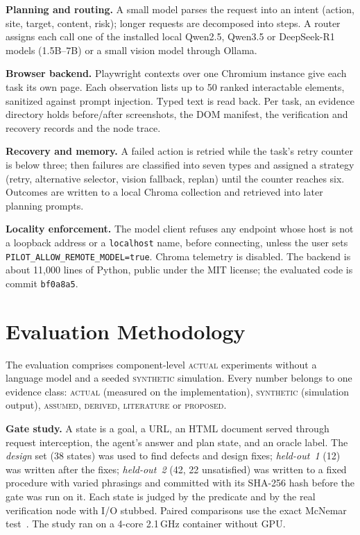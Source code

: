 \documentclass[conference]{IEEEtran}
\newcommand{\status}[1]{\textsc{#1}}
\begin{document}


\textbf{Planning and routing.} A small model parses the request into an intent (action, site, target, content, risk); longer requests are decomposed into steps. A router assigns each call one of the installed local Qwen2.5, Qwen3.5 or DeepSeek-R1 models (1.5B--7B) or a small vision model through Ollama.

\textbf{Browser backend.} Playwright contexts over one Chromium instance give each task its own page. Each observation lists up to 50 ranked interactable elements, sanitized against prompt injection. Typed text is read back. Per task, an evidence directory holds before/after screenshots, the DOM manifest, the verification and recovery records and the node trace.

\textbf{Recovery and memory.} A failed action is retried while the task's retry counter is below three; then failures are classified into seven types and assigned a strategy (retry, alternative selector, vision fallback, replan) until the counter reaches six. Outcomes are written to a local Chroma collection and retrieved into later planning prompts.

\textbf{Locality enforcement.} The model client refuses any endpoint whose host is not a loopback address or a \texttt{localhost} name, before connecting, unless the user sets \texttt{PILOT\_ALLOW\_REMOTE\_MODEL=true}. Chroma telemetry is disabled. The backend is about 11{,}000 lines of Python, public under the MIT license; the evaluated code is commit \texttt{bf0a8a5}.

\section{Evaluation Methodology}

The evaluation comprises component-level \status{actual} experiments without a language model and a seeded \status{synthetic} simulation. Every number belongs to one evidence class: \status{actual} (measured on the implementation), \status{synthetic} (simulation output), \status{assumed}, \status{derived}, \status{literature} or \status{proposed}.

\textbf{Gate study.} A state is a goal, a URL, an HTML document served through request interception, the agent's answer and plan state, and an oracle label. The \emph{design} set (38 states) was used to find defects and design fixes; \emph{held-out~1} (12) was written after the fixes; \emph{held-out~2} (42, 22 unsatisfied) was written to a fixed procedure with varied phrasings and committed with its SHA-256 hash before the gate was run on it. Each state is judged by the predicate and by the real verification node with I/O stubbed. Paired comparisons use the exact McNemar test~\cite{mcnemar1947note}. The study ran on a 4-core 2.1\,GHz container without GPU.
\end{document}
